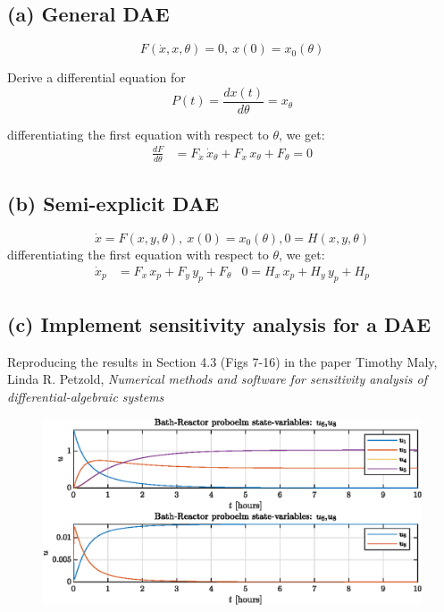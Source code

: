 \subsection*{(a) General DAE}
\begin{equation*}
	F(\dot x, x, \theta) = 0,\ x(0) = x_0(\theta)
\end{equation*}

Derive a differential equation for 
\begin{equation*}
	P (t) = \frac{dx(t)}{d\theta} = x_\theta
\end{equation*}

differentiating the first equation with respect to $\theta$, we get:
\begin{align*}
	\frac{dF}{d\theta} &= F_{\dot x}\,{\dot x}_\theta + F_{x}\,{x}_\theta + F_{\theta} = 0
\end{align*}
\subsection*{ (b) Semi-explicit DAE}
\begin{equation*}
	\dot x = F(x, y, \theta),\ x(0) = x_0(\theta), 0 = H(x,y,\theta)
\end{equation*}
differentiating the first equation with respect to $\theta$, we get:
\begin{align*}
	\dot x_p &= F_x\,x_p + F_y\,y_p + F_\theta & 0 = H_x\,x_p + H_y\,y_p + H_p
\end{align*}
\subsection*{(c) Implement sensitivity analysis for a DAE}
Reproducing the results in Section 4.3 (Figs 7-16) in the paper Timothy Maly, Linda R. Petzold, \textit{Numerical methods and software for sensitivity analysis of differential-algebraic systems}
\begin{figure}[h!b!]
	\centering
	\includegraphics[width=\textwidth]{Figures/Ugf2_9c1.eps}
\end{figure}

